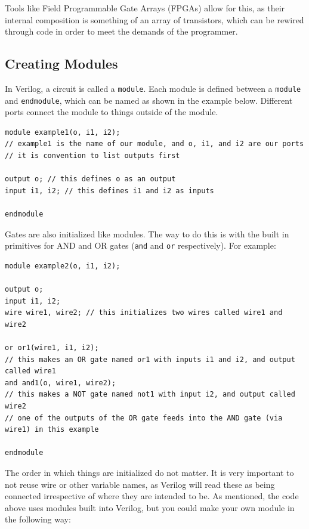 \documentclass[12pt]{report}
\newcommand{\lst}{\lstinline}
\newcommand{\bs}{\bigskip}
\begin{document}
Tools like Field Programmable Gate Arrays (FPGAs) allow for this, as their internal composition is something of an array of transistors, which can be rewired through code in order to meet the demands of the programmer. 


\subsection{Creating Modules} In Verilog, a circuit is called a \lst{module}. Each module is defined between a \lst{module} and \lst{endmodule}, which can be named as shown in the example below. Different ports connect the module to things outside of the module.

\bs

\begin{lstlisting}
module example1(o, i1, i2); 
// example1 is the name of our module, and o, i1, and i2 are our ports 
// it is convention to list outputs first

output o; // this defines o as an output
input i1, i2; // this defines i1 and i2 as inputs

endmodule
\end{lstlisting}

\bs

Gates are also initialized like modules. The way to do this is with the built in primitives for AND and OR gates (\lst{and} and \lst{or} respectively). For example: 

\bs

\begin{lstlisting}
module example2(o, i1, i2); 

output o; 
input i1, i2; 
wire wire1, wire2; // this initializes two wires called wire1 and wire2

or or1(wire1, i1, i2); 
// this makes an OR gate named or1 with inputs i1 and i2, and output called wire1
and and1(o, wire1, wire2);
// this makes a NOT gate named not1 with input i2, and output called wire2
// one of the outputs of the OR gate feeds into the AND gate (via wire1) in this example

endmodule
\end{lstlisting}

\bs

The order in which things are initialized do not matter. It is very important to not reuse wire or other variable names, as Verilog will read these as being connected irrespective of where they are intended to be. As mentioned, the code above uses modules built into Verilog, but you could make your own module in the following way: 
\end{document}
